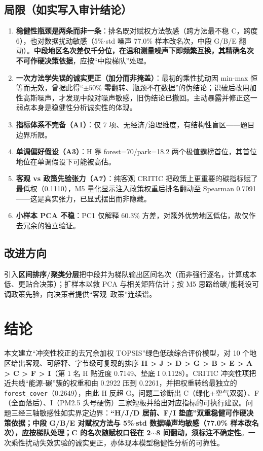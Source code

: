 \documentclass[12pt,a4paper]{ctexart}
\begin{document}
\subsection{局限（如实写入审计结论）}

\begin{enumerate}
\item \textbf{稳健性瓶颈是两条而非一条}：排名既对赋权方法敏感（跨方法最不稳 C，跨度 6），也对数据扰动敏感（5\%$\cdot$std 噪声 77.0\% 样本改名次，中段 G/B/E 翻动）。\textbf{中段地区名次差仅千分位，在温和测量噪声下即频繁互换，其精确名次不可作硬决策依据}，应按``中段梯队''处理。
\item \textbf{一次方法学失误的诚实更正（加分而非掩盖）}：最初的乘性扰动因 min-max 恒等而无效，曾据此得``$\pm50\%$ 零翻转、瓶颈不在数据''的伪结论；识破后改用加性高斯噪声，才发现中段对噪声敏感，旧伪结论已撤回。主动暴露并修正这一弱点本身是稳健性分析诚实性的体现。
\item \textbf{指标体系不完备（A1）}：仅 7 项、无经济/治理维度，有结构性盲区——题目边界所限。
\item \textbf{单调偏好假设（A3）}：H 靠 forest=70/park=18.2 两个极值霸榜首位，其首位地位在单调假设下可能被高估。
\item \textbf{客观 vs 政策先验张力（A7）}：纯客观 CRITIC 把政策上更重要的碳指标赋了最低权（0.1110），M5 量化显示注入政策权重后排名翻动至 Spearman 0.7091——这是真实张力，已显式摆出而非隐藏。
\item \textbf{小样本 PCA 不稳}：PC1 仅解释 60.3\% 方差，对簇外优势地区低估，故仅作去冗余的独立验证。
\end{enumerate}

\subsection{改进方向}

引入\textbf{区间排序/聚类分层}把中段并为梯队输出区间名次（而非强行逐名，计算成本低、更贴合决策）；扩样本以救 PCA 与相关矩阵估计；按 M5 思路给碳/能耗设可调政策先验，向决策者提供``客观--政策''连续谱。

\section{结论}

本文建立``冲突性校正的去冗余加权 TOPSIS''绿色低碳综合评价模型，对 10 个地区给出客观、可解释、字节级可复现的排序 \textbf{H > J > D > G > B > E > A > C > F > I}（第 1 名 H 贴近度 0.7149、垫底 I 0.1128）。CRITIC 冲突性项把近共线``能源-碳''簇的权重和由 0.2922 压到 0.2261，并把权重转给最独立的 \texttt{forest\_cover}（0.2649），由此 H 反超 G。问题二诊断出 C（绿化+空气双弱）、F（全面落后）、I（PM2.5 头号硬伤）三家短板并给出对应指标的可执行建议。问题三经三轴敏感性如实界定边界：\textbf{``H/J/D 居前、F/I 垫底''双重稳健可作硬决策依据；中段 G/B/E 对赋权方法与 5\%$\cdot$std 数据噪声均敏感（77.0\% 样本改名次），应按梯队处理；C 的名次随赋权口径在 2$\sim$8 间翻动，须标注不确定性}。一次乘性扰动失效实验的诚实更正，亦体现本模型稳健性分析的可靠性。
\end{document}
